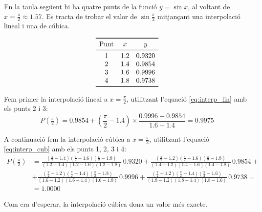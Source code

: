 \begin{exemple}
    En la taula següent hi ha quatre punts de la funció $y = \sin x$, al voltant de $x=\frac{\pi}{2}\approx\num{1,57}$. Es tracta de trobar el valor de $\sin \frac{\pi}{2}$ mitjançant una interpolació lineal i una de cúbica.
    \vspace{-8mm}
    \begin{center}
        \[\begin{array}{ccc}
           \toprule[1pt]
              \text{Punt} & x  & y \\
           \midrule
              1 & \num{1,2} & \num{0,9320} \\
              2 & \num{1,4} & \num{0,9854} \\
              3 & \num{1,6} & \num{0,9996} \\
              4 & \num{1,8} & \num{0,9738} \\
           \bottomrule[1pt]
        \end{array} \]
    \end{center}

    Fem primer la interpolació lineal a $x= \frac{\pi}{2}$, utilitzant l'equació \eqref{eq:interp_lin} amb els punts 2 i 3:
    \[ P\left(\tfrac{\pi}{2}\right) = \num{0,9854}+\left(\frac{\pi}{2}-\num{1,4}\right)\times\frac{\num{0,9996}-\num{0,9854}}{\num{1,6}-\num{1,4}}=
    \num{0,9975} \]

    A continuació fem la interpolació cúbica a $x= \frac{\pi}{2}$, utilitzant l'equació \eqref{eq:interp_cub} amb els punts 1, 2, 3 i 4:
    \[\begin{split}
      P\left(\tfrac{\pi}{2}\right) &= \frac{(\tfrac{\pi}{2}-\num{1,4})(\tfrac{\pi}{2}-\num{1,6})(\tfrac{\pi}{2}-\num{1,8})}{(\num{1,2}-\num{1,4})(\num{1,2}-\num{1,6})(\num{1,2}-\num{1,8})}\, \num{0,9320} +
              \frac{(\tfrac{\pi}{2}-\num{1,2})(\tfrac{\pi}{2}-\num{1,6})(\tfrac{\pi}{2}-\num{1,8})}{(\num{1,4}-\num{1,2})(\num{1,4}-\num{1,6})(\num{1,4}-\num{1,8})}\, \num{0,9854} + {} \\[1.5ex]
           &+ \frac{(\tfrac{\pi}{2}-\num{1,2})(\tfrac{\pi}{2}-\num{1,4})(\tfrac{\pi}{2}-\num{1,8})}{(\num{1,6}-\num{1,2})(\num{1,6}-\num{1,4})(\num{1,6}-\num{1,8})}\, \num{0,9996}+
              \frac{(\tfrac{\pi}{2}-\num{1,2})(\tfrac{\pi}{2}-\num{1,4})(\tfrac{\pi}{2}-\num{1,6})}{(\num{1,8}-\num{1,2})(\num{1,8}-\num{1,4})(\num{1,8}-\num{1,6})}\, \num{0,9738} = {} \\[1.5ex]
           &= \num{1,0000}
    \end{split}\]


    Com era d'esperar, la interpolació cúbica dona un valor més exacte.
\end{exemple}

